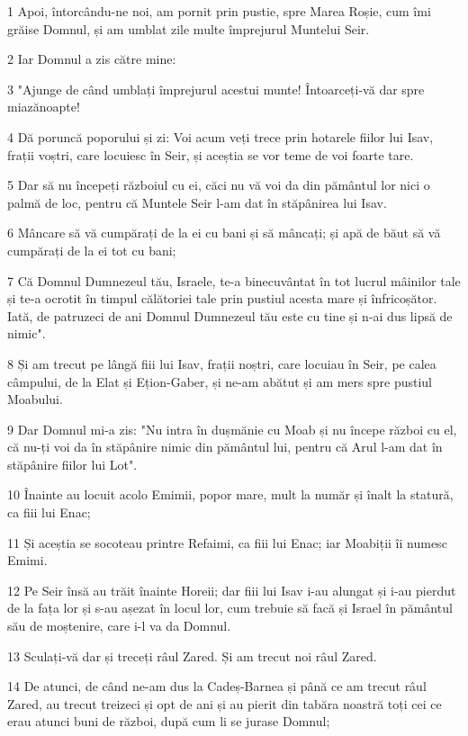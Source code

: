 \par 1 Apoi, întorcându-ne noi, am pornit prin pustie, spre Marea Roșie, cum îmi grăise Domnul, și am umblat zile multe împrejurul Muntelui Seir.
\par 2 Iar Domnul a zis către mine:
\par 3 "Ajunge de când umblați împrejurul acestui munte! Întoarceți-vă dar spre miazănoapte!
\par 4 Dă poruncă poporului și zi: Voi acum veți trece prin hotarele fiilor lui Isav, frații voștri, care locuiesc în Seir, și aceștia se vor teme de voi foarte tare.
\par 5 Dar să nu începeți războiul cu ei, căci nu vă voi da din pământul lor nici o palmă de loc, pentru că Muntele Seir l-am dat în stăpânirea lui Isav.
\par 6 Mâncare să vă cumpărați de la ei cu bani și să mâncați; și apă de băut să vă cumpărați de la ei tot cu bani;
\par 7 Că Domnul Dumnezeul tău, Israele, te-a binecuvântat în tot lucrul mâinilor tale și te-a ocrotit în timpul călătoriei tale prin pustiul acesta mare și înfricoșător. Iată, de patruzeci de ani Domnul Dumnezeul tău este cu tine și n-ai dus lipsă de nimic".
\par 8 Și am trecut pe lângă fiii lui Isav, frații noștri, care locuiau în Seir, pe calea câmpului, de la Elat și Ețion-Gaber, și ne-am abătut și am mers spre pustiul Moabului.
\par 9 Dar Domnul mi-a zis: "Nu intra în dușmănie cu Moab și nu începe război cu el, că nu-ți voi da în stăpânire nimic din pământul lui, pentru că Arul l-am dat în stăpânire fiilor lui Lot".
\par 10 Înainte au locuit acolo Emimii, popor mare, mult la număr și înalt la statură, ca fiii lui Enac;
\par 11 Și aceștia se socoteau printre Refaimi, ca fiii lui Enac; iar Moabiții îi numesc Emimi.
\par 12 Pe Seir însă au trăit înainte Horeii; dar fiii lui Isav i-au alungat și i-au pierdut de la fața lor și s-au așezat în locul lor, cum trebuie să facă și Israel în pământul său de moștenire, care i-l va da Domnul.
\par 13 Sculați-vă dar și treceți râul Zared. Și am trecut noi râul Zared.
\par 14 De atunci, de când ne-am dus la Cadeș-Barnea și până ce am trecut râul Zared, au trecut treizeci și opt de ani și au pierit din tabăra noastră toți cei ce erau atunci buni de război, după cum li se jurase Domnul;
